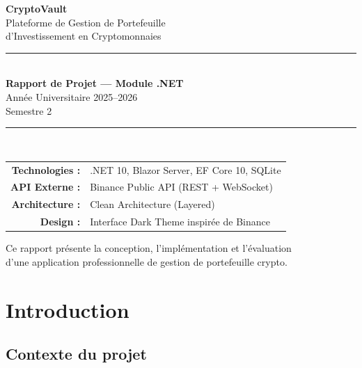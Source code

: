 \documentclass[12pt,a4paper]{article}
\begin{document}
\begin{titlepage}
    \centering
    \vspace*{2cm}

    {\Huge\bfseries CryptoVault}\\[0.5cm]
    {\Large\color{cvblue} Plateforme de Gestion de Portefeuille}\\[0.3cm]
    {\Large\color{cvblue} d'Investissement en Cryptomonnaies}\\[2cm]

    \rule{\textwidth}{1pt}\\[0.8cm]

    {\large\bfseries Rapport de Projet --- Module .NET}\\[0.5cm]
    {\large Année Universitaire 2025--2026}\\[0.3cm]
    {\large Semestre 2}\\[1.5cm]

    \rule{\textwidth}{1pt}\\[1cm]

    \begin{tabular}{rl}
        \textbf{Technologies :} & .NET 10, Blazor Server, EF Core 10, SQLite \\[0.3cm]
        \textbf{API Externe :} & Binance Public API (REST + WebSocket) \\[0.3cm]
        \textbf{Architecture :} & Clean Architecture (Layered) \\[0.3cm]
        \textbf{Design :} & Interface Dark Theme inspirée de Binance \\
    \end{tabular}

    \vfill
    {\small\color{gray} Ce rapport présente la conception, l'implémentation et l'évaluation\\
    d'une application professionnelle de gestion de portefeuille crypto.}
\end{titlepage}

\tableofcontents
\newpage

\section{Introduction}

\subsection{Contexte du projet}
\end{document}
